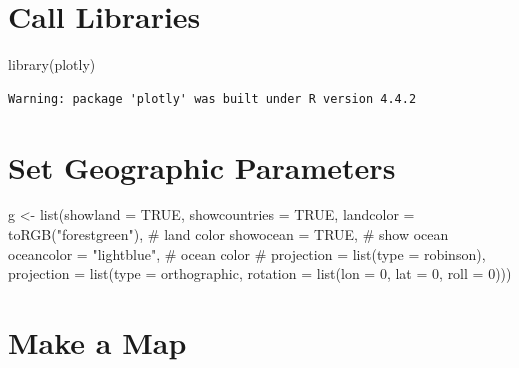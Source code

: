 \documentclass[
  letterpaper,
  DIV=11,
  numbers=noendperiod,
  oneside]{scrreprt}
\newenvironment{Shaded}{\begin{snugshade}}{\end{snugshade}}
\newcommand{\AttributeTok}[1]{\textcolor[rgb]{0.40,0.45,0.13}{#1}}
\newcommand{\CommentTok}[1]{\textcolor[rgb]{0.37,0.37,0.37}{#1}}
\newcommand{\ConstantTok}[1]{\textcolor[rgb]{0.56,0.35,0.01}{#1}}
\newcommand{\DecValTok}[1]{\textcolor[rgb]{0.68,0.00,0.00}{#1}}
\newcommand{\FunctionTok}[1]{\textcolor[rgb]{0.28,0.35,0.67}{#1}}
\newcommand{\NormalTok}[1]{\textcolor[rgb]{0.00,0.23,0.31}{#1}}
\newcommand{\OtherTok}[1]{\textcolor[rgb]{0.00,0.23,0.31}{#1}}
\newcommand{\StringTok}[1]{\textcolor[rgb]{0.13,0.47,0.30}{#1}}
\begin{document}
\section{Call Libraries}\label{call-libraries-9}

\begin{Shaded}
\begin{Highlighting}[]
\FunctionTok{library}\NormalTok{(plotly)}
\end{Highlighting}
\end{Shaded}

\begin{verbatim}
Warning: package 'plotly' was built under R version 4.4.2
\end{verbatim}

\section{Set Geographic Parameters}\label{set-geographic-parameters}

\begin{Shaded}
\begin{Highlighting}[]
\NormalTok{g }\OtherTok{\textless{}{-}} \FunctionTok{list}\NormalTok{(}\AttributeTok{showland =} \ConstantTok{TRUE}\NormalTok{, }
          \AttributeTok{showcountries =} \ConstantTok{TRUE}\NormalTok{,}
          \AttributeTok{landcolor =} \FunctionTok{toRGB}\NormalTok{(}\StringTok{"forestgreen"}\NormalTok{), }\CommentTok{\# land color}
          \AttributeTok{showocean =} \ConstantTok{TRUE}\NormalTok{, }\CommentTok{\# show ocean}
          \AttributeTok{oceancolor =} \StringTok{"lightblue"}\NormalTok{, }\CommentTok{\# ocean color}
          \CommentTok{\# projection = list(type = \textquotesingle{}robinson\textquotesingle{}),}
          \AttributeTok{projection =} \FunctionTok{list}\NormalTok{(}\AttributeTok{type =} \StringTok{\textquotesingle{}orthographic\textquotesingle{}}\NormalTok{,}
                    \AttributeTok{rotation =} \FunctionTok{list}\NormalTok{(}\AttributeTok{lon =} \DecValTok{0}\NormalTok{,}
                                    \AttributeTok{lat =} \DecValTok{0}\NormalTok{,}
                                    \AttributeTok{roll =} \DecValTok{0}\NormalTok{)))}
\end{Highlighting}
\end{Shaded}

\section{Make a Map}\label{make-a-map}
\end{document}
